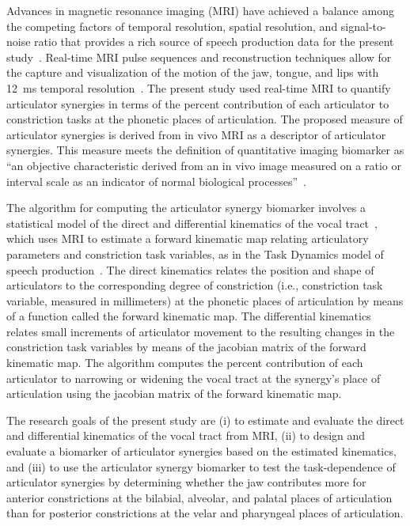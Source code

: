\documentclass[reprint]{JASAnew}\usepackage[]{graphicx}\usepackage[]{color}
\begin{document}
Advances in magnetic resonance imaging (MRI) have achieved a balance among the competing factors of temporal resolution, spatial resolution, and signal-to-noise ratio that provides a rich source of speech production data for the present study~\citep{scott2014speech}. Real-time MRI pulse sequences and reconstruction techniques allow for the capture and visualization of the motion of the jaw, tongue, and lips with \SI{12}{\milli\second} temporal resolution~\citep{toutios2016advances,lingala2016state}. 
%
The present study used real-time MRI to quantify articulator synergies in terms of the percent contribution of each articulator to constriction tasks at the phonetic places of articulation.
%
The proposed measure of articulator synergies is derived from in vivo MRI as a descriptor of articulator synergies. This measure meets the definition of quantitative imaging biomarker as ``an objective characteristic derived from an in vivo image measured on a ratio or interval scale as an indicator of normal biological processes''~\citep{kessler2015emerging,sullivan2015metrology}. 





The algorithm for computing the articulator synergy biomarker involves a statistical model of the direct and differential kinematics of the vocal tract~\citep{lammert2013statistical}, which uses MRI to estimate a forward kinematic map relating articulatory parameters and constriction task variables, as in the Task Dynamics model of speech production~\citep{saltzman1989dynamical}. 
%
The direct kinematics relates the position and shape of articulators to the corresponding degree of constriction (i.e., constriction task variable, measured in millimeters) at the phonetic places of articulation by means of a function called the forward kinematic map. 
%
The differential kinematics relates small increments of articulator movement to the resulting changes in the constriction task variables by means of the jacobian matrix of the forward kinematic map. 
%
The algorithm computes the percent contribution of each articulator to narrowing or widening the vocal tract at the synergy's place of articulation using the jacobian matrix of the forward kinematic map. 






The research goals of the present study are 
%
(i) to estimate and evaluate the direct and differential kinematics of the vocal tract from MRI, 
%
(ii) to design and evaluate a biomarker of articulator synergies based on the estimated kinematics, and
%
(iii) to use the articulator synergy biomarker to test the task-dependence of articulator synergies by determining whether the jaw contributes more for anterior constrictions at the bilabial, alveolar, and palatal places of articulation than for posterior constrictions at the velar and pharyngeal places of articulation. 
\end{document}
